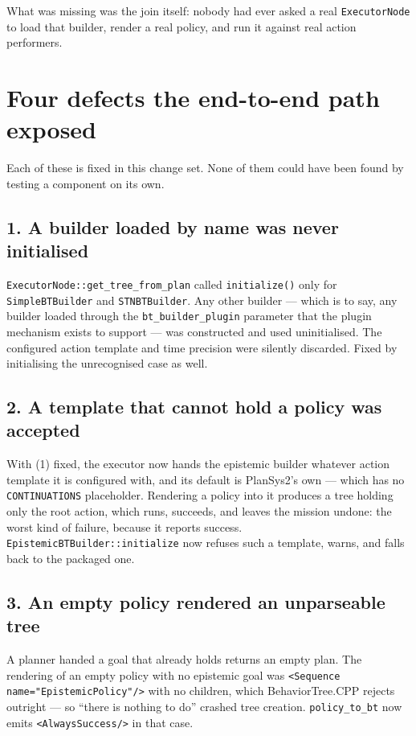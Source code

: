 \documentclass[11pt,a4paper]{article}
\newcommand{\code}[1]{\texttt{\small #1}}
\begin{document}
What was missing was the join itself: nobody had ever asked a real
\code{ExecutorNode} to load that builder, render a real policy, and run it
against real action performers.

\section{Four defects the end-to-end path exposed}

Each of these is fixed in this change set. None of them could have been found
by testing a component on its own.

\subsection*{1. A builder loaded by name was never initialised}

\code{ExecutorNode::get\_tree\_from\_plan} called \code{initialize()} only for
\code{SimpleBTBuilder} and \code{STNBTBuilder}. Any other builder --- which is
to say, any builder loaded through the \code{bt\_builder\_plugin} parameter that
the plugin mechanism exists to support --- was constructed and used
uninitialised. The configured action template and time precision were silently
discarded. Fixed by initialising the unrecognised case as well.

\subsection*{2. A template that cannot hold a policy was accepted}

With (1) fixed, the executor now hands the epistemic builder whatever action
template it is configured with, and its default is PlanSys2's own --- which has
no \code{CONTINUATIONS} placeholder. Rendering a policy into it produces a tree
holding only the root action, which runs, succeeds, and leaves the mission
undone: the worst kind of failure, because it reports success.
\code{EpistemicBTBuilder::initialize} now refuses such a template, warns, and
falls back to the packaged one.

\subsection*{3. An empty policy rendered an unparseable tree}

A planner handed a goal that already holds returns an empty plan. The rendering
of an empty policy with no epistemic goal was
\code{<Sequence name="EpistemicPolicy"/>} with no children, which
BehaviorTree.CPP rejects outright --- so ``there is nothing to do'' crashed tree
creation. \code{policy\_to\_bt} now emits \code{<AlwaysSuccess/>} in that case.
\end{document}
